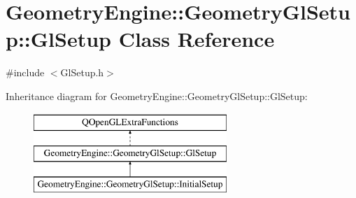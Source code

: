 \hypertarget{class_geometry_engine_1_1_geometry_gl_setup_1_1_gl_setup}{}\section{Geometry\+Engine\+::Geometry\+Gl\+Setup\+::Gl\+Setup Class Reference}
\label{class_geometry_engine_1_1_geometry_gl_setup_1_1_gl_setup}


{\ttfamily \#include $<$Gl\+Setup.\+h$>$}

Inheritance diagram for Geometry\+Engine\+::Geometry\+Gl\+Setup\+::Gl\+Setup\+:\begin{figure}[H]
\begin{center}
\leavevmode
\includegraphics[height=3.000000cm]{class_geometry_engine_1_1_geometry_gl_setup_1_1_gl_setup}
\end{center}
\end{figure}
